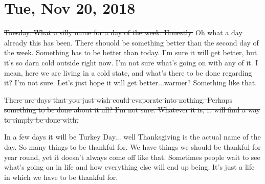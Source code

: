 \section{Tue, Nov 20, 2018}

\st{Tuesday. What a silly name for a day of the week. Honestly.} Oh what a day 
already this has been. There shouold be something better than the second day of the
week. Something has to be better than today. I'm sure it will get better, but it's so
darn cold outside right now. I'm not sure what's going on with any of it. I mean,
here we are living in a cold state, and what's there to be done regarding it? I'm not
sure. Let's just hope it will get better...warmer? Something like that.

\st{There are days that you just wish could evaporate into nothing. Perhaps something
to be done about it all? I'm not sure. Whatever it is, it will find a way to simply
be done with.}

In a few days it will be Turkey Day... well Thanksgiving is the actual name of the
day. So many things to be thankful for. We have things we should be thankful for year
round, yet it doesn't always come off like that. Sometimes people wait to see what's
going on in life and how everything else will end up being. It's just a life in which
we have to be thankful for.